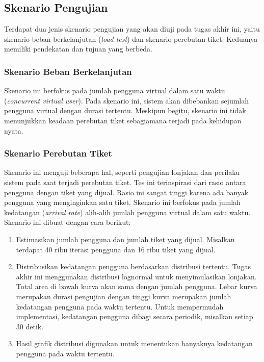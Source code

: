 \subsection{Skenario Pengujian}

Terdapat dua jenis skenario pengujian yang akan diuji pada tugas akhir ini, yaitu skenario beban berkelanjutan (\textit{load test}) dan skenario perebutan tiket. Keduanya memiliki pendekatan dan tujuan yang berbeda.

\subsubsection{Skenario Beban Berkelanjutan}

Skenario ini berfokus pada jumlah pengguna virtual dalam satu waktu (\textit{concurrent virtual user}). Pada skenario ini, sistem akan dibebankan sejumlah pengguna virtual dengan durasi tertentu. Meskipun begitu, skenario ini tidak menunjukkan keadaan perebutan tiket sebagiamana terjadi pada kehidupan nyata.

\subsubsection{Skenario Perebutan Tiket}

Skenario ini menguji beberapa hal, seperti pengujian lonjakan dan perilaku sistem pada saat terjadi perebutan tiket. Tes ini terinspirasi dari rasio antara pengguna dengan tiket yang dijual. Rasio ini sangat tinggi karena ada banyak pengguna yang menginginkan satu tiket. Skenario ini berfokus pada jumlah kedatangan (\textit{arrival rate}) alih-alih jumlah pengguna virtual dalam satu waktu. Skenario ini dibuat dengan cara berikut:

\begin{enumerate}
    \item Estimasikan jumlah pengguna dan jumlah tiket yang dijual. Misalkan terdapat 40 ribu iterasi pengguna dan 16 ribu tiket yang dijual.
    \item Distribusikan kedatangan pengguna berdasarkan distribusi tertentu. Tugas akhir ini menggunakan distribusi lognormal untuk menyimulasikan lonjakan. Total area di bawah kurva akan sama dengan jumlah pengguna. Lebar kurva merupakan durasi pengujian dengan tinggi kurva merupakan jumlah kedatangan pengguna pada waktu tertentu. Untuk mempermudah implementasi, kedatangan pengguna dibagi secara periodik, misalkan setiap 30 detik.
    \item Hasil grafik distribusi digunakan untuk menentukan banyaknya kedatangan pengguna pada waktu tertentu.
\end{enumerate}
